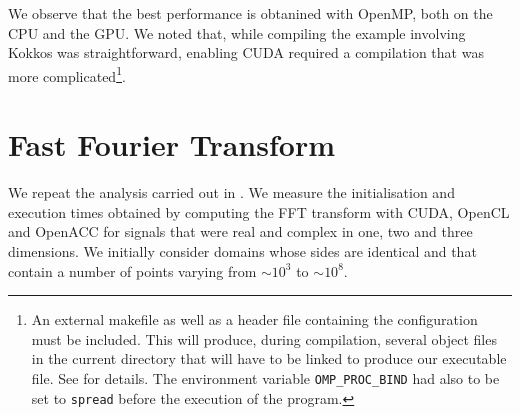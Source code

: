 \documentclass[12pt, a4paper]{article}
\begin{document}
We observe that the best performance is obtanined with OpenMP, both on the CPU and the GPU. We noted that, while compiling the example involving Kokkos was straightforward, enabling CUDA required a compilation that was more complicated\footnote{An external makefile as well as a header file containing the configuration must be included. This will produce, during compilation, several object files in the current directory that will have to be linked to produce our executable file. See \cite{KOKKOSDOC} for details. The environment variable \texttt{OMP\_PROC\_BIND} had also to be set to \texttt{spread} before the execution of the program.}.
\section{Fast Fourier Transform}\label{FFT}
We repeat the analysis carried out in \cite{FFTREPORT}. We measure the initialisation and execution times obtained by computing the FFT transform with CUDA, OpenCL and OpenACC for signals that were real and complex in one, two and three dimensions. We initially consider domains whose sides are identical and that contain a number of points varying from $\sim 10^3$ to $\sim 10^8$. \\
\end{document}
